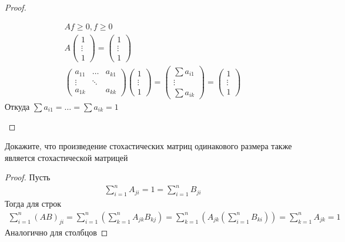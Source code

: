 \begin{proof}
\begin{itemize}
\begin{gather*}
                Af \geqslant 0, f \geqslant 0\\
                A
                \begin{pmatrix}
                    1 \\ \vdots \\ 1
                \end{pmatrix}
                =
                \begin{pmatrix}
                    1 \\ \vdots \\ 1
                \end{pmatrix}
                \\
                \begin{pmatrix}
                    a_{11} & \ldots & a_{k1}\\
                    \vdots & \ddots &\\
                    a_{1k} & & a_{kk}
                \end{pmatrix}
                \begin{pmatrix}
                    1 \\ \vdots \\ 1
                \end{pmatrix}
                =
                \begin{pmatrix}
                    \sum a_{i1} \\ \vdots \\ \sum a_{ik}
                \end{pmatrix}
                =
                \begin{pmatrix}
                    1 \\ \vdots \\ 1
                \end{pmatrix}                
            \end{gather*}
            Откуда $\sum a_{i1} = \ldots = \sum a_{ik} = 1$
        \end{itemize}
    \end{proof}
\vskip 0.6in


    \begin{prob}
        Докажите, что произведение стохастических матриц одинакового размера также является стохастической матрицей
    \end{prob}
    \begin{proof}
        Пусть
        \begin{gather*}
            \sum\limits_{i=1}^{n} A_{ji}
            = 1
            = \sum\limits_{i=1}^{n} B_{ji}
        \end{gather*}
        Тогда для строк
        \begin{gather*}
        \sum\limits_{i=1}^{n} (AB)_{ji}
        = \sum\limits_{i=1}^{n} \left( \sum\limits_{k=1}^{n} A_{jk} B_{kj} \right)
        = \sum\limits_{k=1}^{n} \left( A_{jk} \left( \sum\limits_{i=1}^{n} B_{ki} \right)\right)
        = \sum\limits_{k=1}^{n} A_{jk}
        = 1
        \end{gather*}
        Аналогично для столбцов
    \end{proof}
\vskip 0.6in


